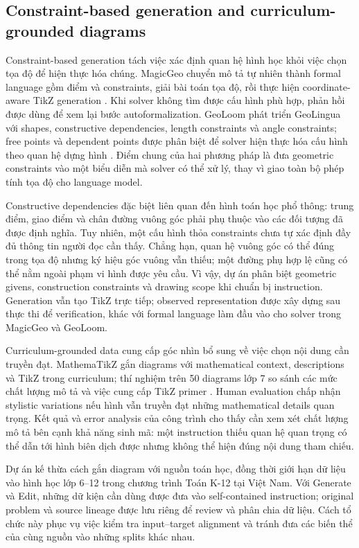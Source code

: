 \documentclass[a4paper,12pt]{article}
\begin{document}
\subsection{Constraint-based generation and curriculum-grounded diagrams}
\label{sec:geometry-ir}
Constraint-based generation tách việc xác định quan hệ hình học khỏi việc chọn tọa độ để hiện thực hóa chúng. MagicGeo chuyển mô tả tự nhiên thành formal language gồm điểm và constraints, giải bài toán tọa độ, rồi thực hiện coordinate-aware TikZ generation \cite{magicgeo}. Khi solver không tìm được cấu hình phù hợp, phản hồi được dùng để xem lại bước autoformalization. GeoLoom phát triển GeoLingua với shapes, constructive dependencies, length constraints và angle constraints; free points và dependent points được phân biệt để solver hiện thực hóa cấu hình theo quan hệ dựng hình \cite{ref3}. Điểm chung của hai phương pháp là đưa geometric constraints vào một biểu diễn mà solver có thể xử lý, thay vì giao toàn bộ phép tính tọa độ cho language model.

Constructive dependencies đặc biệt liên quan đến hình toán học phổ thông: trung điểm, giao điểm và chân đường vuông góc phải phụ thuộc vào các đối tượng đã được định nghĩa. Tuy nhiên, một cấu hình thỏa constraints chưa tự xác định đầy đủ thông tin người đọc cần thấy. Chẳng hạn, quan hệ vuông góc có thể đúng trong tọa độ nhưng ký hiệu góc vuông vẫn thiếu; một đường phụ hợp lệ cũng có thể nằm ngoài phạm vi hình được yêu cầu. Vì vậy, dự án phân biệt geometric givens, construction constraints và drawing scope khi chuẩn bị instruction. Generation vẫn tạo TikZ trực tiếp; observed representation được xây dựng sau thực thi để verification, khác với formal language làm đầu vào cho solver trong MagicGeo và GeoLoom.

Curriculum-grounded data cung cấp góc nhìn bổ sung về việc chọn nội dung cần truyền đạt. MathemaTikZ gắn diagrams với mathematical context, descriptions và TikZ trong curriculum; thí nghiệm trên 50 diagrams lớp 7 so sánh các mức chất lượng mô tả và việc cung cấp TikZ primer \cite{mathematikz}. Human evaluation chấp nhận stylistic variations nếu hình vẫn truyền đạt những mathematical details quan trọng. Kết quả và error analysis của công trình cho thấy cần xem xét chất lượng mô tả bên cạnh khả năng sinh mã: một instruction thiếu quan hệ quan trọng có thể dẫn tới hình biên dịch được nhưng không thể hiện đúng nội dung tham chiếu.

Dự án kế thừa cách gắn diagram với nguồn toán học, đồng thời giới hạn dữ liệu vào hình học lớp 6--12 trong chương trình Toán K-12 tại Việt Nam. Với Generate và Edit, những dữ kiện cần dùng được đưa vào self-contained instruction; original problem và source lineage được lưu riêng để review và phân chia dữ liệu. Cách tổ chức này phục vụ việc kiểm tra input--target alignment và tránh đưa các biến thể của cùng nguồn vào những splits khác nhau.
\end{document}
